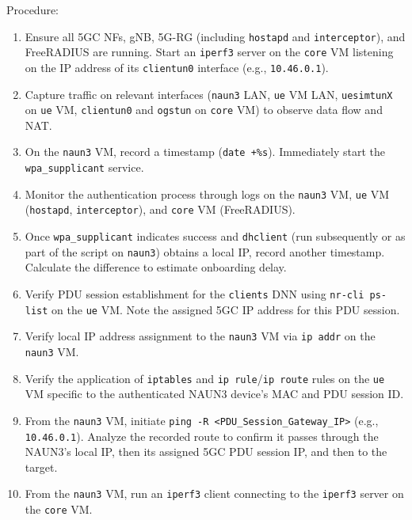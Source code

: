 Procedure:
\begin{enumerate}
    \item Ensure all \ac{5GC} \acp{NF}, \ac{gNB}, \ac{5G-RG} (including \texttt{hostapd} and \texttt{interceptor}), and FreeRADIUS are running. Start an \texttt{iperf3} server on the \texttt{core} \ac{VM} listening on the \ac{IP} address of its \texttt{clientun0} interface (e.g., \texttt{10.46.0.1}).

    \item Capture traffic on relevant interfaces (\texttt{naun3} \ac{LAN}, \texttt{ue} \ac{VM} \ac{LAN}, \texttt{uesimtunX} on \texttt{ue} \ac{VM}, \texttt{clientun0} and \texttt{ogstun} on \texttt{core} \ac{VM}) to observe data flow and \ac{NAT}.

    \item On the \texttt{naun3} \ac{VM}, record a timestamp (\texttt{date +\%s}). Immediately start the \texttt{wpa\_supplicant} service.

    \item Monitor the authentication process through logs on the \texttt{naun3} \ac{VM}, \texttt{ue} \ac{VM} (\texttt{hostapd}, \texttt{interceptor}), and \texttt{core} \ac{VM} (FreeRADIUS).

    \item Once \texttt{wpa\_supplicant} indicates success and \texttt{dhclient} (run subsequently or as part of the script on \texttt{naun3}) obtains a local \ac{IP}, record another timestamp. Calculate the difference to estimate onboarding delay.
    
    \item Verify \ac{PDU} session establishment for the \texttt{clients} \ac{DNN} using \texttt{nr-cli ps-list} on the \texttt{ue} \ac{VM}. Note the assigned \ac{5GC} \ac{IP} address for this \ac{PDU} session.
    
    \item Verify local \ac{IP} address assignment to the \texttt{naun3} \ac{VM} via \texttt{ip addr} on the \texttt{naun3} \ac{VM}.
    
    \item Verify the application of \texttt{iptables} and \texttt{ip rule}/\texttt{ip route} rules on the \texttt{ue} \ac{VM} specific to the authenticated \ac{NAUN3} device's \ac{MAC} and \ac{PDU} session ID.
    
    \item From the \texttt{naun3} \ac{VM}, initiate \texttt{ping -R <PDU\_Session\_Gateway\_IP>} (e.g., \texttt{10.46.0.1}). Analyze the recorded route to confirm it passes through the \ac{NAUN3}'s local \ac{IP}, then its assigned \ac{5GC} \ac{PDU} session \ac{IP}, and then to the target.
    
    \item From the \texttt{naun3} \ac{VM}, run an \texttt{iperf3} client connecting to the \texttt{iperf3} server on the \texttt{core} \ac{VM}.
\end{enumerate}

